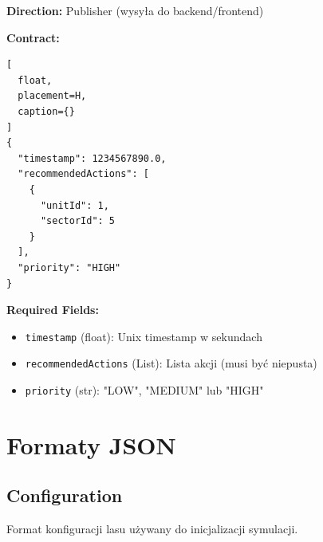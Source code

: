 \documentclass[11pt,a4paper] {article}
\begin{document}
\textbf{Direction:} Publisher (wysyła do backend/frontend)

\textbf{Contract:}
\begin{lstlisting}[
  float,
  placement=H,
  caption={}
] 
{
  "timestamp": 1234567890.0,
  "recommendedActions": [
    {
      "unitId": 1,
      "sectorId": 5
    }
  ],
  "priority": "HIGH"
}
\end{lstlisting}

\textbf{Required Fields:}
\begin{itemize}
    \item \texttt{timestamp} (float): Unix timestamp w sekundach
    \item \texttt{recommendedActions} (List): Lista akcji (musi być niepusta)
    \item \texttt{priority} (str): "LOW", "MEDIUM" lub "HIGH"
\end{itemize}

\section{Formaty JSON}

\subsection{Configuration}

Format konfiguracji lasu używany do inicjalizacji symulacji.
\end{document}

